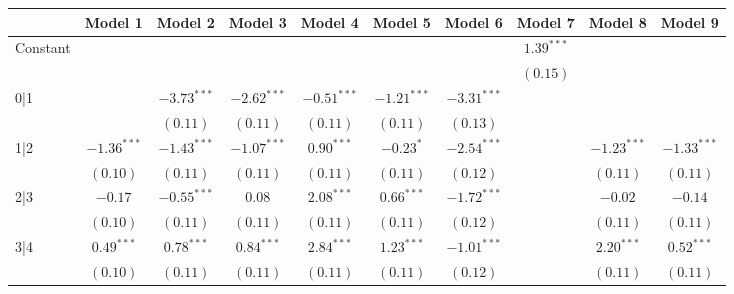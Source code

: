 
\usepackage{booktabs}
\usepackage{threeparttable}

\begin{table}
\begin{center}
\begin{threeparttable}
\begin{tabular}{l c c c c c c c c c}
\toprule
 & Model 1 & Model 2 & Model 3 & Model 4 & Model 5 & Model 6 & Model 7 & Model 8 & Model 9 \\
\midrule
Constant                        &               &               &               &               &               &               & $1.39^{***}$  &               &               \\
                                &               &               &               &               &               &               & $(0.15)$      &               &               \\
0|1                             &               & $-3.73^{***}$ & $-2.62^{***}$ & $-0.51^{***}$ & $-1.21^{***}$ & $-3.31^{***}$ &               &               &               \\
                                &               & $(0.11)$      & $(0.11)$      & $(0.11)$      & $(0.11)$      & $(0.13)$      &               &               &               \\
1|2                             & $-1.36^{***}$ & $-1.43^{***}$ & $-1.07^{***}$ & $0.90^{***}$  & $-0.23^{*}$   & $-2.54^{***}$ &               & $-1.23^{***}$ & $-1.33^{***}$ \\
                                & $(0.10)$      & $(0.11)$      & $(0.11)$      & $(0.11)$      & $(0.11)$      & $(0.12)$      &               & $(0.11)$      & $(0.11)$      \\
2|3                             & $-0.17$       & $-0.55^{***}$ & $0.08$        & $2.08^{***}$  & $0.66^{***}$  & $-1.72^{***}$ &               & $-0.02$       & $-0.14$       \\
                                & $(0.10)$      & $(0.11)$      & $(0.11)$      & $(0.11)$      & $(0.11)$      & $(0.12)$      &               & $(0.11)$      & $(0.11)$      \\
3|4                             & $0.49^{***}$  & $0.78^{***}$  & $0.84^{***}$  & $2.84^{***}$  & $1.23^{***}$  & $-1.01^{***}$ &               & $2.20^{***}$  & $0.52^{***}$  \\
                                & $(0.10)$      & $(0.11)$      & $(0.11)$      & $(0.11)$      & $(0.11)$      & $(0.12)$      &               & $(0.11)$      & $(0.11)$      \\

\end{tabular}
\end{threeparttable}
\end{center}
\end{table}
